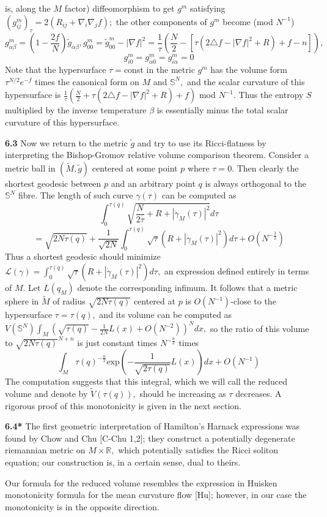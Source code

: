 \documentclass[12pt]{article}
\theoremstyle{plain}
{\swapnumbers
\newtheorem{thm}{Theorem}[section]
\newtheorem{cor}[thm]{Corollary}
\newtheorem{lem}[thm]{Lemma}
\newtheorem{prop}[thm]{Proposition}
}
\theoremstyle{definition}
{\swapnumbers
\newtheorem{defn}[thm]{Definition}
\newtheorem{nota}[thm]{Notation}
\newtheorem{parag}[thm]{}
\newtheorem*{parstr}{\addtocounter{thm}{1}\thesection.\arabic{thm}*}
\newtheorem*{intropar}{\addtocounter{thm}{1}\arabic{thm}}
}
\theoremstyle{remark} {\swapnumbers
\newtheorem{rem}[thm]{Remark}
\newtheorem{exam}[thm]{Example}
\newtheorem{lemma}[thm]{Lemma}
\newtheorem{claim}[thm]{Claim}
}
\numberwithin{equation}{section}
\begin{document}
is, along the $M$ factor) diffeomorphism to get $g^m$ satisfying
$(g^m_{ij})_\tau=2(R_{ij}+\nabla_i\nabla_j f);$ the other
components of $g^m$ become (mod $N^{-1}$)
$$g^m_{\alpha\beta}=(1-\frac{2f}{N})\tilde{g}_{\alpha\beta},
g^m_{00}=\tilde{g}^m_{00}-|\nabla
f|^2=\frac{1}{\tau}(\frac{N}{2}-[\tau(2\triangle f-|\nabla f|^2
+R)+f-n]),$$ $$ g^m_{i 0}=g^m_{\alpha 0}=g^m_{i \alpha}=0$$ Note
that the hypersurface $\tau=$const in the metric $g^m$ has the
volume form $\tau^{N/2}e^{-f}$ times the canonical form on $M$ and
$\mathbb{S}^N,$ and the scalar curvature of this hypersurface is
$\frac{1}{\tau}(\frac{N}{2}+\tau(2\triangle f-|\nabla f|^2+R)+f)$
mod $N^{-1}.$  Thus the entropy $S$ multiplied by  the inverse
temperature $\beta$ is essentially minus the total scalar
curvature of this hypersurface. \par {\bf 6.3} Now we return to
the metric $\tilde{g}$ and try to use its Ricci-flatness by
interpreting the Bishop-Gromov relative volume comparison theorem.
Consider a metric ball in $(\tilde{M},\tilde{g})$ centered at some
point $p$ where $\tau=0.$ Then clearly the shortest geodesic
between $p$ and an arbitrary point $q$ is always orthogonal to the
$\mathbb{S}^N$ fibre. The length of such curve $\gamma(\tau)$ can
be computed as
$$\int_0^{\tau(q)}{\sqrt{\frac{N}{2\tau}+R+|\dot{\gamma}_M(\tau)|^2}d\tau}$$
$$
=\sqrt{2N\tau(q)}+\frac{1}{\sqrt{2N}}\int_0^{\tau(q)}{\sqrt{\tau}(R+|\dot{\gamma}_M(\tau)|^2)d\tau}+
O(N^{-\frac{3}{2}})$$ Thus a shortest geodesic should minimize
$\mathcal{L}(\gamma)=\int_0^{\tau(q)}{\sqrt{\tau}(R+|\dot{\gamma}_M(\tau)|^2)d\tau},$
an expression defined entirely in terms of $M$. Let $L(q_M)$
denote the corresponding infimum. It follows that a metric sphere
in $\tilde{M}$ of radius $\sqrt{2N\tau(q)}$ centered at $p$ is
$O(N^{-1})$-close to the hypersurface $\tau=\tau(q),$ and its
volume can be computed as
$V(\mathbb{S}^N)\int_M{(\sqrt{\tau(q)}-\frac{1}{2N}L(x)+O(N^{-2}))^Ndx},$
so the ratio of this volume to $\sqrt{2N\tau(q)}^{N+n}$ is just
constant times $N^{-\frac{n}{2}}$ times
$$\int_M{\tau(q)^{-\frac{n}{2}}\mbox{exp}(-\frac{1}{\sqrt{2\tau(q)}}L(x))dx}+O(N^{-1})$$
The computation suggests that this integral, which we will call
the reduced volume and denote by $\tilde{V}(\tau(q)),$ should be
increasing as $\tau$ decreases. A rigorous proof of this
monotonicity is given in the next section. \par {\bf 6.4*} The
first geometric interpretation of Hamilton's Harnack expressions
was found by Chow and Chu [C-Chu 1,2]; they construct a
potentially degenerate riemannian metric on $M\times \mathbb{R},$
which potentially satisfies the Ricci soliton equation; our
construction is, in a certain sense, dual to theirs. \par Our
formula for the reduced volume resembles the expression in Huisken
monotonicity formula for the mean curvature flow [Hu]; however, in
our case the monotonicity is in the opposite direction.
\end{document}
